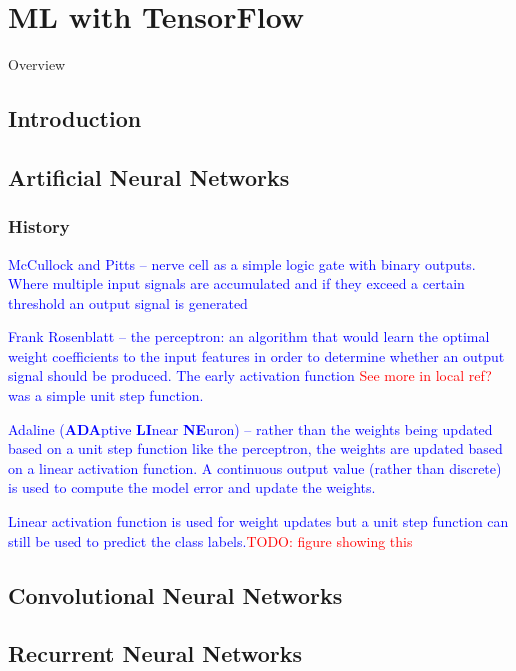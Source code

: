 \chapter{ML with TensorFlow}

Overview

\section{Introduction}

\section{Artificial Neural Networks}

\subsection{History}

\textcolor{blue}{McCullock and Pitts -- nerve cell as a simple logic gate with binary outputs.  Where multiple input signals are accumulated and if they exceed a certain threshold an output signal is generated}

\textcolor{blue}{Frank Rosenblatt -- the perceptron: an algorithm that would learn the optimal weight coefficients to the input features in order to determine whether an output signal should be produced. The early activation function \textcolor{red}{See more in local ref?} was a simple unit step function.}

\textcolor{blue}{Adaline (\textbf{ADA}ptive \textbf{LI}near \textbf{NE}uron) -- rather than the weights being updated based on a unit step function like the perceptron, the weights are updated based on a linear activation function. A continuous output value (rather than discrete) is used to compute the model error and update the weights.}

\textcolor{blue}{Linear activation function is used for weight updates but a unit step function can still be used to predict the class labels.\textcolor{red}{TODO: figure showing this}}

\section{Convolutional Neural Networks}

\section{Recurrent Neural Networks}

